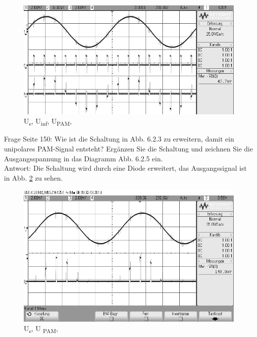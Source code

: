\documentclass[12pt,a4paper]{scrartcl}
\begin{document}
               
    \begin{figure}[htbp]
    \begin{minipage}{1\textwidth}
         \centering
         \includegraphics[width=1\textwidth]{scope_0}
         \caption{U\textsubscript{s}, U\textsubscript{inf}, U\textsubscript{PAM},}
   
          \label{fig:pulsamplitudenmoduliertes-signal}
    \end{minipage}
    \end{figure}
    \newpage
    Frage Seite 150: Wie ist die Schaltung in Abb. 6.2.3 zu erweitern, damit ein unipolares PAM-Signal entsteht? Ergänzen Sie die Schaltung und zeichnen Sie die Ausgangsspannung in das Diagramm Abb. 6.2.5 ein.\\ Antwort: Die Schaltung wird durch eine Diode erweitert, das Ausgangssignal ist in Abb. \ref{fig:pulsamplitudenmoduliertes-signal-gleichgerichtet} zu sehen.
    
    \begin{figure}[htbp]
    \begin{minipage}{1\textwidth}
         \centering
         \includegraphics[width=1\textwidth]{scope_1}
         \caption{U\textsubscript{s}, U    \textsubscript{PAM},}
   
          \label{fig:pulsamplitudenmoduliertes-signal-gleichgerichtet}
    \end{minipage}
    \end{figure}
    \newpage
    
\end{document}
